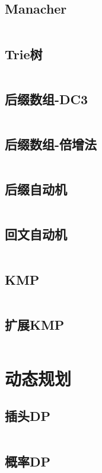 \documentclass[UTF8]{ctexart}
\begin{document}
\subsection{Manacher}
\inputminted{cpp}{string/Manacher回文串.cpp}

\subsection{Trie树}
\inputminted{cpp}{string/Trie树.cpp}

\subsection{后缀数组-DC3}
\inputminted{cpp}{string/后缀数组-DC3.cpp}

\subsection{后缀数组-倍增法}
\inputminted{cpp}{string/后缀数组-倍增法.cpp}

\subsection{后缀自动机}
\inputminted{cpp}{string/后缀自动机.cpp}

\subsection{回文自动机}
\inputminted{cpp}{string/回文自动机.cpp}

\subsection{KMP}
\inputminted{cpp}{string/KMP.cpp}

\subsection{扩展KMP}
\inputminted{cpp}{string/扩展KMP.cpp}

\section{动态规划}

\subsection{插头DP}
\inputminted{cpp}{dp/插头dp.cpp}

\subsection{概率DP}
\inputminted{cpp}{dp/概率dp.cpp}
\end{document}
